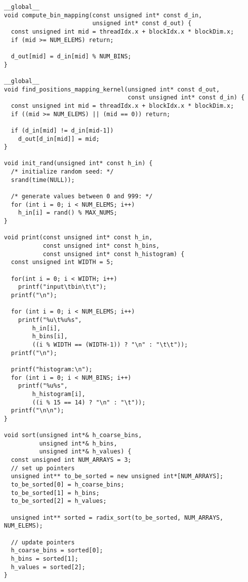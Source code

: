 \begin{lstlisting}[captionpos=t, xleftmargin=0.0pt, xrightmargin=0.0pt, caption={Coarse Histogram implementation}, label={lst:coarse histogram impl}]
__global__
void compute_bin_mapping(const unsigned int* const d_in,
                         unsigned int* const d_out) {
  const unsigned int mid = threadIdx.x + blockIdx.x * blockDim.x;
  if (mid >= NUM_ELEMS) return;

  d_out[mid] = d_in[mid] % NUM_BINS;
}

__global__
void find_positions_mapping_kernel(unsigned int* const d_out,
                                   const unsigned int* const d_in) {
  const unsigned int mid = threadIdx.x + blockIdx.x * blockDim.x;
  if ((mid >= NUM_ELEMS) || (mid == 0)) return;

  if (d_in[mid] != d_in[mid-1])
    d_out[d_in[mid]] = mid;
}

void init_rand(unsigned int* const h_in) {
  /* initialize random seed: */
  srand(time(NULL));

  /* generate values between 0 and 999: */
  for (int i = 0; i < NUM_ELEMS; i++)
    h_in[i] = rand() % MAX_NUMS;
}

void print(const unsigned int* const h_in,
           const unsigned int* const h_bins,
           const unsigned int* const h_histogram) {
  const unsigned int WIDTH = 5;

  for(int i = 0; i < WIDTH; i++)
    printf("input\tbin\t\t");
  printf("\n");

  for (int i = 0; i < NUM_ELEMS; i++)
    printf("%u\t%u%s", 
        h_in[i], 
        h_bins[i], 
        ((i % WIDTH == (WIDTH-1)) ? "\n" : "\t\t"));
  printf("\n");

  printf("histogram:\n");
  for (int i = 0; i < NUM_BINS; i++)
    printf("%u%s", 
        h_histogram[i], 
        ((i % 15 == 14) ? "\n" : "\t"));
  printf("\n\n");
}

void sort(unsigned int*& h_coarse_bins, 
          unsigned int*& h_bins, 
          unsigned int*& h_values) {
  const unsigned int NUM_ARRAYS = 3;
  // set up pointers
  unsigned int** to_be_sorted = new unsigned int*[NUM_ARRAYS];
  to_be_sorted[0] = h_coarse_bins;
  to_be_sorted[1] = h_bins;
  to_be_sorted[2] = h_values;

  unsigned int** sorted = radix_sort(to_be_sorted, NUM_ARRAYS, NUM_ELEMS);

  // update pointers
  h_coarse_bins = sorted[0];
  h_bins = sorted[1];
  h_values = sorted[2];
}


\end{lstlisting}
